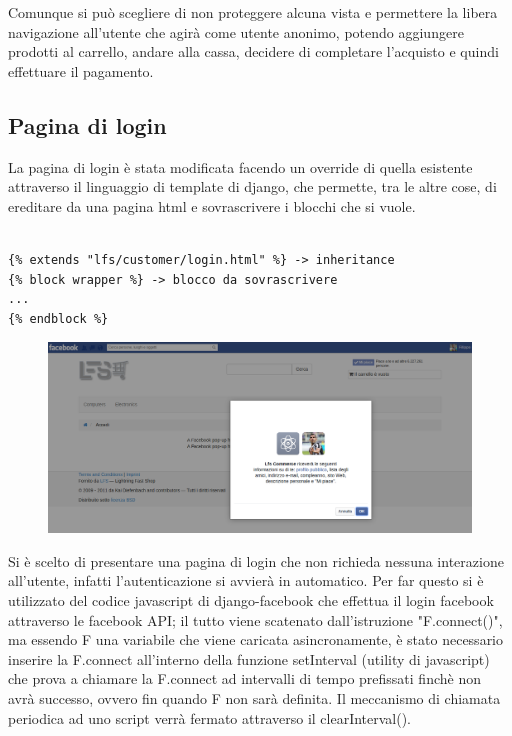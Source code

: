 Comunque si può scegliere di non proteggere alcuna vista e permettere la libera navigazione all'utente che agirà come utente anonimo, potendo aggiungere prodotti al carrello, andare alla cassa, decidere di completare l'acquisto e quindi effettuare il pagamento.

\subsection{Pagina di login}
La pagina di login è stata modificata facendo un override di quella esistente attraverso il linguaggio di template di django, che permette, tra le altre cose, di ereditare da una pagina html e sovrascrivere i blocchi che si vuole.


\begin{lstlisting}[language=html]

{% extends "lfs/customer/login.html" %} -> inheritance
{% block wrapper %} -> blocco da sovrascrivere
...
{% endblock %}

\end{lstlisting}

\begin{figure}
\includegraphics[width=0.9\columnwidth]{img/richiesta_permessi}
\end{figure}

Si è scelto di presentare una pagina di login che non richieda nessuna interazione all'utente, infatti l'autenticazione si avvierà in automatico. Per far questo si è utilizzato del codice javascript di django-facebook che effettua il login facebook attraverso le facebook API; il tutto viene scatenato dall'istruzione "F.connect()", ma essendo F una variabile che viene caricata asincronamente, è stato necessario inserire la F.connect all'interno della funzione setInterval (utility di javascript) che prova a chiamare la F.connect ad intervalli di tempo prefissati finchè non avrà successo, ovvero fin quando F non sarà definita. Il meccanismo di chiamata periodica ad uno script verrà fermato attraverso il clearInterval().

